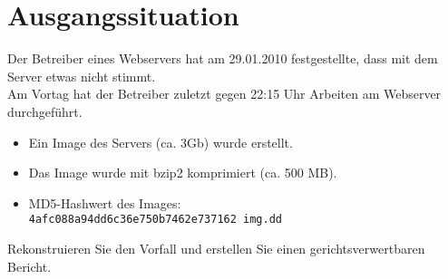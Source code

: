 \section{Ausgangssituation}

Der Betreiber eines Webservers hat am 29.01.2010 festgestellte, dass mit dem Server etwas nicht stimmt. \\
Am Vortag hat der Betreiber zuletzt gegen 22:15 Uhr Arbeiten am Webserver durchgeführt.
\begin{itemize}
\item Ein Image des Servers (ca. 3Gb) wurde erstellt.
\item Das Image wurde mit bzip2 komprimiert (ca. 500 MB).
\item MD5-Hashwert des Images:\\
\texttt{4afc088a94dd6c36e750b7462e737162  img.dd}
\end{itemize}

\noindent Rekonstruieren Sie den Vorfall und erstellen Sie einen gerichtsverwertbaren Bericht.